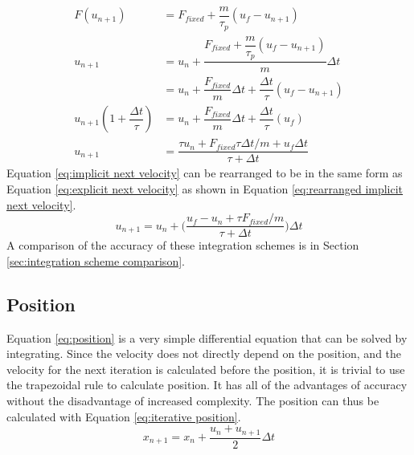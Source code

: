 \documentclass[a4paper,11pt,titlepage]{report}
\begin{document}
\begin{align}
F(u_{n+1}) &= F_{fixed} + \dfrac{m}{\tau_p}(u_f - u_{n+1}) \nonumber \\
u_{n+1} &= u_n + \dfrac{F_{fixed} + \dfrac{m}{\tau_p}(u_f - u_{n+1})}{m}\Delta t \nonumber \\
&= u_n + \dfrac{F_{fixed}}{m}\Delta t + \dfrac{\Delta t}{\tau}(u_f - u_{n+1}) \nonumber \\
u_{n+1} (1 + \dfrac{\Delta t}{\tau}) &= u_n + \dfrac{F_{fixed}}{m}\Delta t + \dfrac{\Delta t}{\tau}(u_f) \nonumber \\
u_{n+1} &= \dfrac{\tau u_n + F_{fixed} \tau \Delta t / m + u_f \Delta t}{\tau + \Delta t} \label{eq:implicit next velocity}
\end{align}
Equation \ref{eq:implicit next velocity} can be rearranged to be in the same form as Equation \ref{eq:explicit next velocity} as shown in Equation \ref{eq:rearranged implicit next velocity}.
\begin{equation}
u_{n+1} = u_n + \Big(\dfrac{u_f - u_n + \tau F_{fixed} / m}{\tau + \Delta t}\Big)\Delta t
\label{eq:rearranged implicit next velocity}
\end{equation}
A comparison of the accuracy of these integration schemes is in Section \ref{sec:integration scheme comparison}.
\subsection{Position}
Equation \ref{eq:position} is a very simple differential equation that can be solved by integrating. Since the velocity does not directly depend on the position, and the velocity for the next iteration is calculated before the position, it is trivial to use the trapezoidal rule to calculate position. It has all of the advantages of accuracy without the disadvantage of increased complexity. The position can thus be calculated with Equation \ref{eq:iterative position}.
\begin{equation}
x_{n+1} = x_n + \dfrac{u_n + u_{n+1}}{2}\Delta t
\label{eq:iterative position}
\end{equation}
\end{document}
